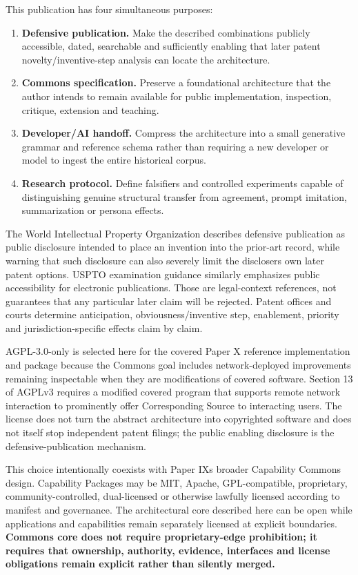 \documentclass[
  10pt,
  letterpaper,
]{article}
\providecommand{\tightlist}{%
  \setlength{\itemsep}{0pt}\setlength{\parskip}{0pt}}
\begin{document}
This publication has four simultaneous purposes:

\begin{enumerate}
\def\labelenumi{\arabic{enumi}.}
\tightlist
\item
  \textbf{Defensive publication.} Make the described combinations
  publicly accessible, dated, searchable and sufficiently enabling that
  later patent novelty/inventive-step analysis can locate the
  architecture.
\item
  \textbf{Commons specification.} Preserve a foundational architecture
  that the author intends to remain available for public implementation,
  inspection, critique, extension and teaching.
\item
  \textbf{Developer/AI handoff.} Compress the architecture into a small
  generative grammar and reference schema rather than requiring a new
  developer or model to ingest the entire historical corpus.
\item
  \textbf{Research protocol.} Define falsifiers and controlled
  experiments capable of distinguishing genuine structural transfer from
  agreement, prompt imitation, summarization or persona effects.
\end{enumerate}

The World Intellectual Property Organization describes defensive
publication as public disclosure intended to place an invention into the
prior-art record, while warning that such disclosure can also severely
limit the discloser\textquotesingle s own later patent options. USPTO
examination guidance similarly emphasizes public accessibility for
electronic publications. Those are legal-context references, not
guarantees that any particular later claim will be rejected. Patent
offices and courts determine anticipation, obviousness/inventive step,
enablement, priority and jurisdiction-specific effects claim by claim.

AGPL-3.0-only is selected here for the covered Paper X reference
implementation and package because the Commons goal includes
network-deployed improvements remaining inspectable when they are
modifications of covered software. Section 13 of AGPLv3 requires a
modified covered program that supports remote network interaction to
prominently offer Corresponding Source to interacting users. The license
does not turn the abstract architecture into copyrighted software and
does not itself stop independent patent filings; the public enabling
disclosure is the defensive-publication mechanism.

This choice intentionally coexists with Paper IX\textquotesingle s
broader Capability Commons design. Capability Packages may be MIT,
Apache, GPL-compatible, proprietary, community-controlled, dual-licensed
or otherwise lawfully licensed according to manifest and governance. The
architectural core described here can be open while applications and
capabilities remain separately licensed at explicit boundaries.
\textbf{Commons core does not require proprietary-edge prohibition; it
requires that ownership, authority, evidence, interfaces and license
obligations remain explicit rather than silently merged.}
\end{document}
